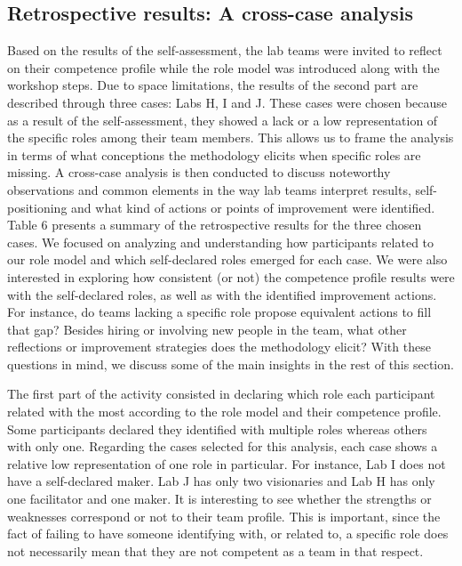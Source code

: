 \documentclass[AMA,STIX1COL,APA,STIX2COL]{WileyNJD-v2}
\begin{document}
\hypertarget{retrospective-results-a-cross-case-analysis}{%
\subsection{Retrospective results: A cross-case
analysis}\label{retrospective-results-a-cross-case-analysis}}

Based on the results of the self-assessment, the lab teams were invited
to reflect on their competence profile while the role model was
introduced along with the workshop steps. Due to space limitations, the
results of the second part are described through three cases: Labs H, I
and J. These cases were chosen because as a result of the
self-assessment, they showed a lack or a low representation of the
specific roles among their team members. This allows us to frame the
analysis in terms of what conceptions the methodology elicits when
specific roles are missing. A cross-case analysis is then conducted to
discuss noteworthy observations and common elements in the way lab teams
interpret results, self-positioning and what kind of actions or points
of improvement were identified. Table 6 presents a summary of the
retrospective results for the three chosen cases. We focused on
analyzing and understanding how participants related to our role model
and which self-declared roles emerged for each case. We were also
interested in exploring how consistent (or not) the competence profile
results were with the self-declared roles, as well as with the
identified improvement actions. For instance, do teams lacking a
specific role propose equivalent actions to fill that gap? Besides
hiring or involving new people in the team, what other reflections or
improvement strategies does the methodology elicit? With these questions
in mind, we discuss some of the main insights in the rest of this
section.

The first part of the activity consisted in declaring which role each
participant related with the most according to the role model and their
competence profile. Some participants declared they identified with
multiple roles whereas others with only one. Regarding the cases
selected for this analysis, each case shows a relative low
representation of one role in particular. For instance, Lab I does not
have a self-declared maker. Lab J has only two visionaries and Lab H has
only one facilitator and one maker. It is interesting to see whether the
strengths or weaknesses correspond or not to their team profile. This is
important, since the fact of failing to have someone identifying with,
or related to, a specific role does not necessarily mean that they are
not competent as a team in that respect.
\end{document}
